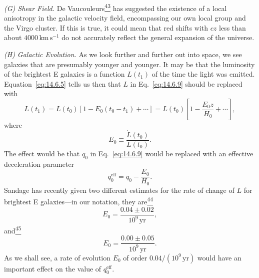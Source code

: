 \medskip
\noindent\textit{(G) Shear Field.}
De Vaucouleurs\hyperref[ch14-ref-43]{\textsuperscript{43}} has suggested the
existence of a local anisotropy in the galactic velocity field, encompassing
our own local group and the Virgo cluster. If this is true, it could mean
that red shifts with \(cz\) less than about
\(4000\,\mathrm{km\,s^{-1}}\) do not accurately reflect the general
expansion of the universe.

\medskip
\noindent\textit{(H) Galactic Evolution.}
As we look further and further out into space, we see galaxies that are
presumably younger and younger. It may be that the luminosity of the
brightest E galaxies is a function \(L(t_1)\) of the time the light was
emitted. Equation~\eqref{eq:14.6.5} tells us then that \(L\) in
Eq.~\eqref{eq:14.6.9} should be replaced with
\[
  L(t_1)
  =
  L(t_0)
  \left[
    1-E_0(t_0-t_1)+\cdots
  \right]
  =
  L(t_0)
  \left[
    1-\frac{E_0z}{H_0}+\cdots
  \right],
\]
where
\begin{equation}
  E_0\equiv\frac{\dot L(t_0)}{L(t_0)}.
  \tag{14.6.11}\label{eq:14.6.11}
\end{equation}
The effect would be that \(q_0\) in Eq.~\eqref{eq:14.6.9} would be replaced
with an effective deceleration parameter
\begin{equation}
  q_0^{\mathrm{eff}}
  =
  q_0-\frac{E_0}{H_0}.
  \tag{14.6.12}\label{eq:14.6.12}
\end{equation}
Sandage has recently given two different estimates for the rate of change of
\(L\) for brightest E galaxies---in our notation, they
are\hyperref[ch14-ref-44]{\textsuperscript{44}}
\begin{equation}
  E_0
  =
  \frac{0.04\pm0.02}{10^9\,\mathrm{yr}},
  \tag{14.6.13}\label{eq:14.6.13}
\end{equation}
and\hyperref[ch14-ref-45]{\textsuperscript{45}}
\begin{equation}
  E_0
  =
  \frac{0.00\pm0.05}{10^9\,\mathrm{yr}}.
  \tag{14.6.14}\label{eq:14.6.14}
\end{equation}
As we shall see, a rate of evolution \(E_0\) of order
\(0.04/(10^9\,\mathrm{yr})\) would have an important effect on the value of
\(q_0^{\mathrm{eff}}\).

